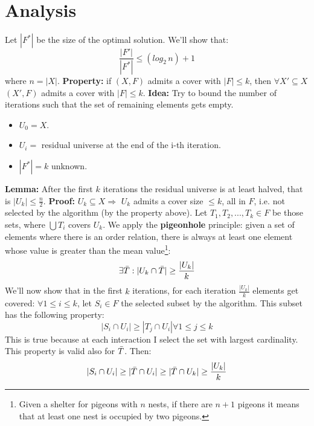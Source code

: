 \section{Analysis}
Let $|F^*|$ be the size of the optimal solution. We'll show that:
\[\frac{|F'|}{|F^*|} \leq (log_2\,n) + 1\]
where $n = |X|$.\newline\newline
\textbf{Property:} if $(X, F)$ admits a cover with $|F| \leq k$, then $\forall X' \subseteq X$ $(X', F)$ admits a cover with $|F| \leq k$.\newline\newline
\textbf{Idea:} Try to bound the number of iterations such that the set of remaining elements gets empty.
\begin{itemize}
    \item $U_0 = X$.
    \item $U_i = $ residual universe at the end of the i-th iteration.
    \item  $|F^*| = k$ unknown.
\end{itemize}
\textbf{Lemma:} After the first $k$ iterations the residual universe is at least halved, that is $|U_k| \leq \frac{n}{2}$.\newline\newline
\textbf{Proof:} $U_k \subseteq X \Rightarrow $ $U_k$ admits a cover size $\leq k$, all in $F$, i.e. not selected by the algorithm (by the property above). Let $T_1, T_2,..., T_k \in F$ be those sets, where $\bigcup T_i$ covers $U_k$.\newline\newline
We apply the \textbf{pigeonhole} principle: given a set of elements where there is an order relation, there is always at least one element whose value is greater than the mean value\footnote{Given a shelter for pigeons with $n$ nests, if there are $n+1$ pigeons it means that at least one nest is occupied by two pigeons.}:
\[\exists \Bar{T} : |U_k \cap \Bar{T}| \geq \frac{|U_k|}{k}\]
We'll now show that in the first $k$ iterations, for each iteration $\frac{|U_k|}{k}$ elements get covered:\newline\newline
$\forall 1 \leq i \leq k$, let $S_i \in F$ the selected subset by the algorithm. This subset has the following property:
\[|S_i \cap U_i| \geq |T_j \cap U_i| \forall 1 \leq j \leq k\]
This is true because at each interaction I select the set with largest cardinality. This property is valid also for $\Bar{T}$. Then:
\[|S_i \cap U_i| \geq |\Bar{T} \cap U_i| \geq |\Bar{T} \cap U_k| \geq \frac{|U_k|}{k}\]
